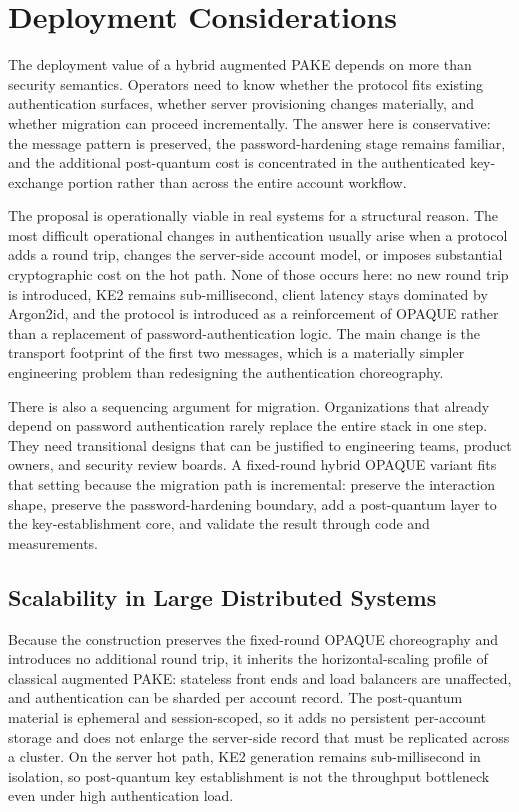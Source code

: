 \documentclass[conference]{IEEEtran}
\begin{document}
\section{Deployment Considerations}

The deployment value of a hybrid augmented PAKE depends on more than security semantics. Operators need to know whether the protocol fits existing authentication surfaces, whether server provisioning changes materially, and whether migration can proceed incrementally. The answer here is conservative: the message pattern is preserved, the password-hardening stage remains familiar, and the additional post-quantum cost is concentrated in the authenticated key-exchange portion rather than across the entire account workflow.

The proposal is operationally viable in real systems for a structural reason. The most difficult operational changes in authentication usually arise when a protocol adds a round trip, changes the server-side account model, or imposes substantial cryptographic cost on the hot path. None of those occurs here: no new round trip is introduced, KE2 remains sub-millisecond, client latency stays dominated by Argon2id, and the protocol is introduced as a reinforcement of OPAQUE rather than a replacement of password-authentication logic. The main change is the transport footprint of the first two messages, which is a materially simpler engineering problem than redesigning the authentication choreography.

There is also a sequencing argument for migration. Organizations that already depend on password authentication rarely replace the entire stack in one step. They need transitional designs that can be justified to engineering teams, product owners, and security review boards. A fixed-round hybrid OPAQUE variant fits that setting because the migration path is incremental: preserve the interaction shape, preserve the password-hardening boundary, add a post-quantum layer to the key-establishment core, and validate the result through code and measurements.

\subsection{\color{blue}Scalability in Large Distributed Systems}

\begingroup\color{blue}
Because the construction preserves the fixed-round OPAQUE choreography and introduces no additional round trip, it inherits the horizontal-scaling profile of classical augmented PAKE: stateless front ends and load balancers are unaffected, and authentication can be sharded per account record. The post-quantum material is ephemeral and session-scoped, so it adds no persistent per-account storage and does not enlarge the server-side record that must be replicated across a cluster. On the server hot path, KE2 generation remains sub-millisecond in isolation, so post-quantum key establishment is not the throughput bottleneck even under high authentication load.
\end{document}
